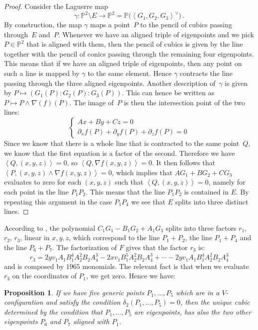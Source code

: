 \documentclass[11pt, a4paper, reqno, captions=tableheading,bibliography=totoc]{scrartcl}
\theoremstyle{plain}
\newtheorem{prop}[lemma]{Proposition}
\theoremstyle{definition}
\newcommand{\p}{\mathbb{P}}
\begin{document}
\begin{proof}
Consider the Laguerre map
%
\[
 \gamma \colon \p^2 \setminus E \longrightarrow \p^2 =
 \p \bigl( \left\langle G_1, G_2, G_3 \right\rangle^\vee \bigr) \,.
\]
%
By construction, the map $\gamma$ maps a point~$P$ to the pencil of cubics passing through~$E$ and~$P$.
Whenever we have an aligned triple of eigenpoints and we pick $P \in \p^2$ that is aligned with them, then the pencil of cubics is given by the line together with the pencil of conics passing through the remaining four eigenpoints.
This means that if we have an aligned triple of eigenpoints, then any point on such a line is mapped by $\gamma$ to the same element.
Hence $\gamma$ contracts the line passing through the three aligned eigenpoints.
Another description of~$\gamma$ is given by $P \mapsto (G_1(P): G_2(P): G_3(P))$.
This can hence be written as $P \mapsto P \wedge \nabla(f)(P)$.
The image of~$P$ is then the intersection point of the two lines:
%
\[
 \left\{
 \begin{array}{l}
  A x + B y + Cz  = 0\\
  \partial_x f(P) + \partial_y f (P) + \partial_z f(P) = 0
 \end{array}
 \right.
\]
%
Since we know that there is a whole line that is contracted to the same point~$Q$,
we know that the first equation is a factor of the second.
Therefore we have $\left\langle Q, (x,y,z) \right\rangle = 0$, so $\left\langle Q, \nabla f (x,y,z) \right\rangle = 0$.
It then follows that $\left\langle P, (x, y, z) \wedge \nabla f(x,y,z) \right\rangle = 0$, which implies that $A G_1 + B G_2 + C G_3$ evaluates to zero for each $(x,y,z)$ such that $\left\langle Q, (x,y,z) \right\rangle= 0$, namely for each point in the line $P_1 P_2$.
This means that the line $P_1 P_2$ is contained in $E$.
By repeating this argument in the case $P_1 P_4$ we see that $E$ splits into three distinct lines.
\end{proof}

According to , the polynomial
$C_1G_1-B_1G_2+A_1G_3$ splits into three factors $r_1$, $r_2$, $r_3$,
linear in $x, y, z$, which
correspond to the line $P_1+P_2$, the line $P_1+P_4$ and the line $P_6+P_7$.
The factorization of $F$ gives that the factor $r_3$ is:
\[
r_3 = 2yv_1A_1B_1^4A_2^2B_2A_4^3-2xv_1B_1^5A_2^2B_2A_4^3+\cdots
-2 yv_1A_1B_1^4A_2^2B_2A_4^3
\]
and is composed by $1965$ monomials. The relevant fact is that when we
evaluate $r_3$ on the coordinates of $P_1$, we get zero. Hence we have:
\begin{prop}
If we have five generic points $P_1, \dots, P_5$ which are in a
$V$-configuration and satisfy the condition $\delta_2(P_1, \dots, P_5) = 0$,
then the unique cubic determined by the condition that $P_1, \dots, P_5$
are eigenpoints, has also the two other eigenpoints $P_6$ and $P_7$
aligned with $P_1$.
\end{prop}
\end{document}
